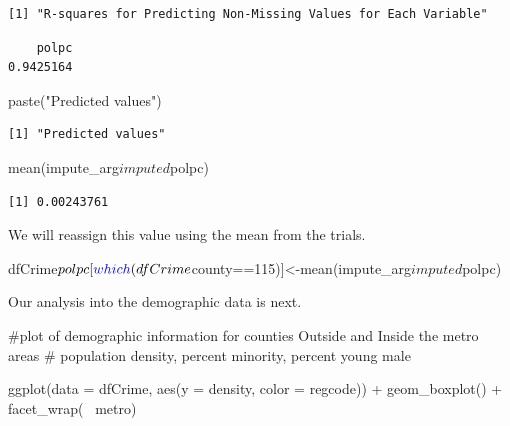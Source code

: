 \documentclass[]{article}
\newenvironment{Shaded}{}{}
\newcommand{\CommentTok}[1]{\textcolor[rgb]{0.00,0.50,0.00}{#1}}
\newcommand{\DataTypeTok}[1]{#1}
\newcommand{\DecValTok}[1]{#1}
\newcommand{\KeywordTok}[1]{\textcolor[rgb]{0.00,0.00,1.00}{#1}}
\newcommand{\NormalTok}[1]{#1}
\newcommand{\OperatorTok}[1]{#1}
\newcommand{\StringTok}[1]{\textcolor[rgb]{0.00,0.50,0.50}{#1}}
\begin{document}
\begin{verbatim}
[1] "R-squares for Predicting Non-Missing Values for Each Variable"
\end{verbatim}

\begin{Shaded}
\end{Shaded}

\begin{verbatim}
    polpc 
0.9425164 
\end{verbatim}

\begin{Shaded}
\begin{Highlighting}[]
\KeywordTok{paste}\NormalTok{(}\StringTok{"Predicted values"}\NormalTok{)}
\end{Highlighting}
\end{Shaded}

\begin{verbatim}
[1] "Predicted values"
\end{verbatim}

\begin{Shaded}
\begin{Highlighting}[]
\KeywordTok{mean}\NormalTok{(impute_arg}\OperatorTok{$}\NormalTok{imputed}\OperatorTok{$}\NormalTok{polpc)}
\end{Highlighting}
\end{Shaded}

\begin{verbatim}
[1] 0.00243761
\end{verbatim}

We will reassign this value using the mean from the trials.

\begin{Shaded}
\begin{Highlighting}[]
\NormalTok{dfCrime}\OperatorTok{$}\NormalTok{polpc[}\KeywordTok{which}\NormalTok{(dfCrime}\OperatorTok{$}\NormalTok{county}\OperatorTok{==}\DecValTok{115}\NormalTok{)]<-}\KeywordTok{mean}\NormalTok{(impute_arg}\OperatorTok{$}\NormalTok{imputed}\OperatorTok{$}\NormalTok{polpc)}
\end{Highlighting}
\end{Shaded}

Our analysis into the demographic data is next.

\begin{Shaded}
\begin{Highlighting}[]
\CommentTok{#plot of demographic information for counties Outside and Inside the metro areas}
\CommentTok{# population density, percent minority, percent young male}

\KeywordTok{ggplot}\NormalTok{(}\DataTypeTok{data =}\NormalTok{ dfCrime, }\KeywordTok{aes}\NormalTok{(}\DataTypeTok{y =}\NormalTok{ density, }\DataTypeTok{color =}\NormalTok{ regcode)) }\OperatorTok{+}
\StringTok{      }\KeywordTok{geom_boxplot}\NormalTok{() }\OperatorTok{+}\StringTok{ }\KeywordTok{facet_wrap}\NormalTok{(}\OperatorTok{~}\StringTok{ }\NormalTok{metro)}
\end{Highlighting}
\end{Shaded}
\end{document}

